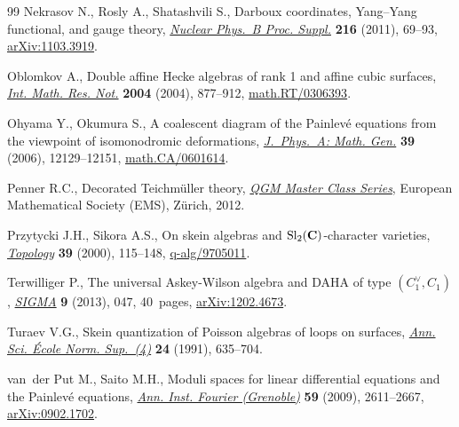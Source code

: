 \documentclass[pdftex]{sigma}
\numberwithin{equation}{section}
\begin{document}
\begin{thebibliography}{99}
Nekrasov N., Rosly A., Shatashvili S., Darboux coordinates, {Y}ang--{Y}ang
 functional, and gauge theory, \href{https://doi.org/10.1016/j.nuclphysbps.2011.04.150}{\textit{Nuclear Phys.~B Proc. Suppl.}}
 \textbf{216} (2011), 69--93, \href{https://arxiv.org/abs/1103.3919}{arXiv:1103.3919}.

Oblomkov A., Double affine {H}ecke algebras of rank 1 and affine cubic
 surfaces, \href{https://doi.org/10.1155/S1073792804133072}{\textit{Int. Math. Res. Not.}} \textbf{2004} (2004), 877--912,
 \href{https://arxiv.org/abs/math.RT/0306393}{math.RT/0306393}.

Ohyama Y., Okumura S., A coalescent diagram of the {P}ainlev\'{e} equations
 from the viewpoint of iso\-mo\-nodromic deformations, \href{https://doi.org/10.1088/0305-4470/39/39/S08}{\textit{J.~Phys.~A: Math.
 Gen.}} \textbf{39} (2006), 12129--12151, \href{https://arxiv.org/abs/math.CA/0601614}{math.CA/0601614}.

Penner R.C., Decorated {T}eichm\"{u}ller theory, \href{https://doi.org/10.4171/075}{\textit{QGM Master Class Series}},
 European Mathematical Society (EMS), Z\"{u}rich, 2012.

Przytycki J.H., Sikora A.S., On skein algebras and {${\rm Sl}_2({\bf
 C})$}-character varieties, \href{https://doi.org/10.1016/S0040-9383(98)00062-7}{\textit{Topology}} \textbf{39} (2000), 115--148,
 \href{https://arxiv.org/abs/q-alg/9705011}{q-alg/9705011}.

Terwilliger P., The universal {A}skey-{W}ilson algebra and {DAHA} of type
 {$(C^\vee_1,C_1)$}, \href{https://doi.org/10.3842/SIGMA.2013.047}{\textit{SIGMA}} \textbf{9} (2013), 047, 40~pages,
 \href{https://arxiv.org/abs/1202.4673}{arXiv:1202.4673}.

Turaev V.G., Skein quantization of {P}oisson algebras of loops on surfaces,
 \href{https://doi.org/10.24033/asens.1639}{\textit{Ann. Sci. \'{E}cole Norm. Sup.~(4)}} \textbf{24} (1991), 635--704.

van~der Put M., Saito M.H., Moduli spaces for linear differential equations and
 the {P}ainlev\'{e} equations, \href{https://doi.org/10.5802/aif.2502}{\textit{Ann. Inst. Fourier (Grenoble)}}
 \textbf{59} (2009), 2611--2667, \href{https://arxiv.org/abs/0902.1702}{arXiv:0902.1702}.

\end{thebibliography}\LastPageEnding
\end{document}
